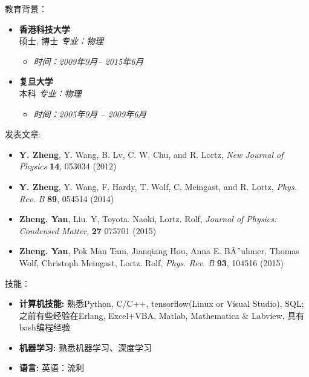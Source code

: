 \documentclass[a4paper,9pt,oneside]{scrartcl}
\newenvironment{ressection}[1]{
    \vspace{2pt}
    {\large#1}
    \begin{itemize}
    \vspace{2pt}
}{
    \end{itemize}
}
\newcommand{\resitem}[1]{
    \vspace{-4pt}
    \item #1
}
\newcommand{\resitems}[1]{
    \vspace{-4pt}
    \item #1
}
\newcommand{\ressubitem}[1]{
    \vspace{0pt}
    \item #1
}
\newcommand{\resbigitem}[3]{
    \vspace{-5pt}
    \item
    \textbf{#1}\\
    #2
    \textit{#3}
}
\newenvironment{ressubsec}[3]{
\resbigitem{#1}{#2}{#3}
    \vspace{-2pt}
    \begin{itemize}
}{
    \end{itemize}
}
\begin{document}
\begin{CJK*}{UTF8}{gbsn}



\begin{ressection}{教育背景：}
    \begin{ressubsec}{香港科技大学}{硕士, 博士} {专业：物理} 
        \ressubitem{\itshape 时间：2009年9月-- 2015年6月}
    \end{ressubsec}
    \begin{ressubsec}{复旦大学}{本科}{专业：物理}
        \ressubitem{\itshape 时间：2005年9月 -- 2009年6月}
    \end{ressubsec}
\end{ressection}


\begin{ressection}{发表文章:}
	\resitems{\textbf{Y. Zheng}, Y. Wang, B. Lv, C. W. Chu, and R. Lortz, \emph{New Journal of Physics} \textbf{14}, 053034 (2012)}
	\resitems{\textbf{Y. Zheng}, Y. Wang, F. Hardy, T. Wolf, C. Meingast, and R. Lortz, \emph{Phys. Rev. B} \textbf{89}, 054514 (2014)}
	\resitems{\textbf{Zheng. Yan}, Liu. Y, Toyota. Naoki, Lortz. Rolf, \emph{Journal of Physics: Condensed Matter}, \textbf{27} 075701 (2015)}
	\resitems{\textbf{Zheng. Yan}, Pok Man Tam, Jianqiang Hou, Anna E. BÃ˝uhmer, Thomas Wolf, Christoph Meingast, Lortz. Rolf, \emph{Phys. Rev. B} \textbf{93}, 104516
	(2015)}
\end{ressection}



\begin{ressection}{技能：}
    \resitem{\textbf{计算机技能:}  熟悉Python, C/C++, tensorflow(Linux or Visual Studio), SQL; 之前有些经验在Erlang, Excel+VBA, Matlab, Mathematica \& Labview, 具有bash编程经验}
	\resitem{\textbf{机器学习:} 熟悉机器学习、深度学习}
    \resitem{\textbf{语言:} 英语：流利}

\end{ressection}

\vspace{2pt}

\end{CJK*}
\end{document}

